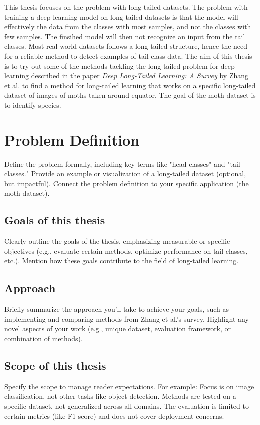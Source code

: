 

\label{sec:introduction}
This thesis focuses on the problem with long-tailed datasets. The problem with training a deep learning model on long-tailed datasets is that the model will effectively 
the data from the classes with most samples, and not the classes with few samples. The finsihed model will then not recognize an input from the tail classes. Most real-world
datasets follows a long-tailed structure, hence the need for a reliable method to detect examples of tail-class data. The aim of this thesis is to try out some of the
 methods tackling the long-tailed problem for deep learning described in the paper \textit{Deep Long-Tailed Learning: A Survey} by Zhang et al.\cite{zhang2023deep} to find a method for long-tailed
 learning that works on a specific long-tailed dataset of images of moths taken around equator. The goal of the moth dataset is to identify species.



\section{Problem Definition}
Define the problem formally, including key terms like "head classes" and "tail classes."
Provide an example or visualization of a long-tailed dataset (optional, but impactful).
Connect the problem definition to your specific application (the moth dataset).

\subsection{Goals of this thesis}
Clearly outline the goals of the thesis, emphasizing measurable or specific objectives (e.g., evaluate certain methods, optimize performance on tail classes, etc.).
Mention how these goals contribute to the field of long-tailed learning.

\subsection{Approach}
Briefly summarize the approach you’ll take to achieve your goals, such as implementing and comparing methods from Zhang et al.’s survey.
Highlight any novel aspects of your work (e.g., unique dataset, evaluation framework, or combination of methods).

\subsection{Scope of this thesis}
Specify the scope to manage reader expectations. For example:
Focus is on image classification, not other tasks like object detection.
Methods are tested on a specific dataset, not generalized across all domains.
The evaluation is limited to certain metrics (like F1 score) and does not cover deployment concerns.

